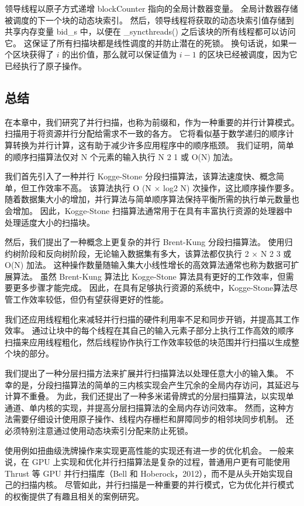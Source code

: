 领导线程以原子方式递增 blockCounter 指向的全局计数器变量。 全局计数器存储被调度的下一个块的动态块索引。 然后，领导线程将获取的动态块索引值存储到共享内存变量 bid\_s 中，以便在 \_syncthreads() 之后该块的所有线程都可以访问它。 这保证了所有扫描块都是线性调度的并防止潜在的死锁。 换句话说，如果一个区块获得了 $i$ 的出价值，那么就可以保证值为 $i-1$ 的区块已经被调度，因为它已经执行了原子操作。

\subsection{总结}
在本章中，我们研究了并行扫描，也称为前缀和，作为一种重要的并行计算模式。 扫描用于将资源并行分配给需求不一致的各方。 它将看似基于数学递归的顺序计算转换为并行计算，这有助于减少许多应用程序中的顺序瓶颈。 我们证明，简单的顺序扫描算法仅对 N 个元素的输入执行 N 2 1 或 O(N) 加法。

我们首先引入了一种并行 Kogge-Stone 分段扫描算法，该算法速度快、概念简单，但工作效率不高。 该算法执行 O (N × log2 N) 次操作，这比顺序操作要多。 随着数据集大小的增加，并行算法与简单顺序算法保持平衡所需的执行单元数量也会增加。 因此，Kogge-Stone 扫描算法通常用于在具有丰富执行资源的处理器中处理适度大小的扫描块。

然后，我们提出了一种概念上更复杂的并行 Brent-Kung 分段扫描算法。 使用归约树阶段和反向树阶段，无论输入数据集有多大，该算法都仅执行 2 × N 2 3 或 O(N) 加法。 这种操作数量随输入集大小线性增长的高效算法通常也称为数据可扩展算法。 虽然 Brent-Kung 算法比 Kogge-Stone 算法具有更好的工作效率，但需要更多步骤才能完成。 因此，在具有足够执行资源的系统中，Kogge-Stone算法尽管工作效率较低，但仍有望获得更好的性能。

我们还应用线程粗化来减轻并行扫描的硬件利用率不足和同步开销，并提高其工作效率。 通过让块中的每个线程在其自己的输入元素子部分上执行工作高效的顺序扫描来应用线程粗化，然后线程协作执行工作效率较低的块范围并行扫描以生成整个块的部分。

我们提出了一种分层扫描方法来扩展并行扫描算法以处理任意大小的输入集。 不幸的是，分段扫描算法的简单的三内核实现会产生冗余的全局内存访问，其延迟与计算不重叠。 为此，我们还提出了一种多米诺骨牌式的分层扫描算法，以实现单通道、单内核的实现，并提高分层扫描算法的全局内存访问效率。 然而，这种方法需要仔细设计使用原子操作、线程内存栅栏和屏障同步的相邻块同步机制。 还必须特别注意通过使用动态块索引分配来防止死锁。

使用例如扭曲级洗牌操作来实现更高性能的实现还有进一步的优化机会。 一般来说，在 GPU 上实现和优化并行扫描算法是复杂的过程，普通用户更有可能使用 Thrust 等 GPU 并行扫描库（Bell 和 Hoberock，2012），而不是从头开始实现自己的扫描内核。 尽管如此，并行扫描是一种重要的并行模式，它为优化并行模式的权衡提供了有趣且相关的案例研究。